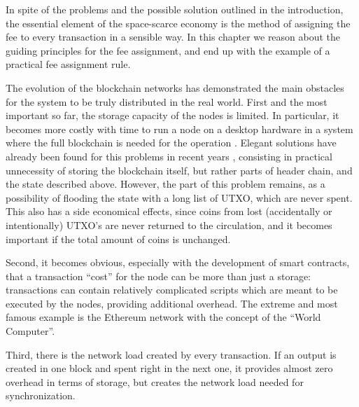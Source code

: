 \documentclass[]{llncs}   %
\newcommand{\authnote}[2]{\marginpar{\parbox{\marginparwidth}{\tiny %
  \textsf{#1 {\textcolor{blue}{notes: #2}}}}}%
  \textcolor{blue}{\textbf{\dag}}}
\newcommand{\authnote}[2]{
  \textsf{#1\textcolor{blue}{ #2}}}
\newcommand{\authnote}[2]{}
\newcommand{\knote}[1]{{\authnote{\textcolor{green}{Alex notes:}}{#1}}}
\newcommand{\vk}[1]{{\authnote{\textcolor{red}{V:}}{#1}}}
\begin{document}
In spite of the problems and the possible solution outlined in the introduction,
the essential element of the space-scarce economy is the method of assigning the
fee to every transaction in a sensible way. In this chapter we reason about the guiding 
principles for the fee assignment, and end up with the example of a practical fee assignment rule.

The evolution of the blockchain networks has demonstrated the main obstacles for
the system to be truly distributed in the real world. First and the most
important so far, the storage capacity of the nodes is limited. In particular, it
becomes more costly with time to run a node on a desktop hardware in a system 
where the full blockchain is needed for the operation \vk{more details}.
Elegant solutions have already been found for this problems in recent years
\vk{citations}, consisting in practical unnecessity of storing the blockchain
itself, but rather parts of header chain, and the state described above.
However, the part of this problem remains, as a possibility of flooding
the state with a long list of UTXO, which are never spent. This also has a side
economical effects, since coins from lost (accidentally or intentionally) UTXO's
are never returned to the circulation, and it becomes important if the total
amount of coins is unchanged.

Second, it becomes obvious, especially with the development of smart contracts,
that a transaction ``cost'' for the node can be more than just a storage:
transactions can contain relatively complicated scripts which are meant to be
executed by the nodes, providing additional overhead. The extreme and most
famous example is the Ethereum network with the concept of the ``World
Computer''. %

Third, there is the network load created by every transaction. If
an output is created in one block and spent right in the next one, it provides
almost zero overhead in terms of storage, but creates the network load
needed for synchronization.

\knote{refer here to a fee as a security measure concepts in the intro?}
\end{document}

